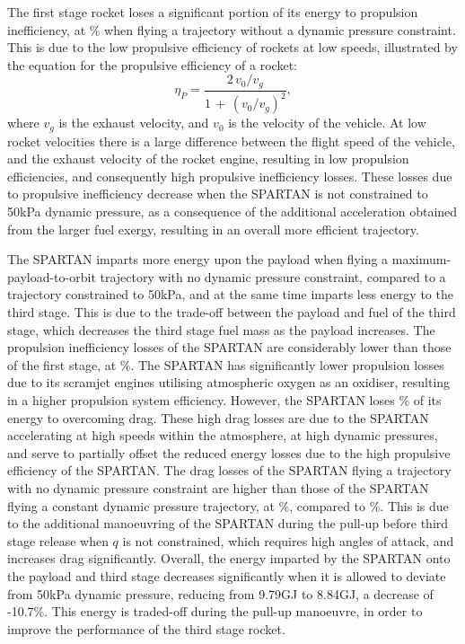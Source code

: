The first stage rocket loses a significant portion of its energy to propulsion inefficiency, at \PlossoneCombinedStandardNoReturn \% when flying a trajectory without a dynamic pressure constraint.  This is due to the low propulsive efficiency of rockets at low speeds, illustrated by the equation for the propulsive efficiency of a rocket\cite{RPE}:
\begin{equation}\label{eq:rocketeff}
\eta_P = \frac{2\,v_0/v_g}{1\,+\,(v_0/v_g)^2}, 
\end{equation}
where $v_g$ is the exhaust velocity, and $v_0$ is the velocity of the vehicle.
At low rocket velocities there is a large difference between the flight speed of the vehicle, and the exhaust velocity of the rocket engine, resulting in low propulsion efficiencies, and consequently high propulsive inefficiency losses. These losses due to propulsive inefficiency decrease when the SPARTAN is not constrained to 50kPa dynamic pressure, as a consequence of the additional acceleration obtained from the larger fuel exergy, resulting in an overall more efficient trajectory. 
 

The SPARTAN imparts more energy upon the payload when flying a maximum-payload-to-orbit trajectory with no dynamic pressure constraint, compared to a trajectory constrained to 50kPa, and at the same time imparts less energy to the third stage. This is due to the trade-off between the payload and fuel of the third stage, which decreases the third stage fuel mass as the payload increases. 
The propulsion inefficiency losses of the SPARTAN are considerably lower than those of the first stage, at \PlosssecondCombinedStandardNoReturn \%.
The SPARTAN has significantly lower propulsion losses due to its scramjet engines utilising atmospheric oxygen as an oxidiser, resulting in a higher propulsion system efficiency.
 However, the SPARTAN loses \WDsecondStandardNoReturn \% of its energy to overcoming drag. These high drag losses are due to the SPARTAN accelerating at high speeds within the atmosphere, at high dynamic pressures, and serve to partially offset the reduced energy losses due to the high propulsive efficiency of the SPARTAN. 
The drag losses of the SPARTAN flying a trajectory with no dynamic pressure constraint are higher than those of the SPARTAN flying a constant dynamic pressure trajectory, at \WDsecondStandardNoReturn\%, compared to \WDsecondConstqNoReturn\%. This is due to the additional manoeuvring of the SPARTAN during the pull-up before third stage release when $q$ is not constrained, which requires high angles of attack, and increases drag significantly. 
Overall, the energy imparted by the SPARTAN onto the payload and third stage decreases significantly when it is allowed to deviate from 50kPa dynamic pressure, reducing from 9.79GJ to 8.84GJ, a decrease of -10.7\%. This energy is traded-off during the pull-up manoeuvre, in order to improve the performance of the third stage rocket. 

